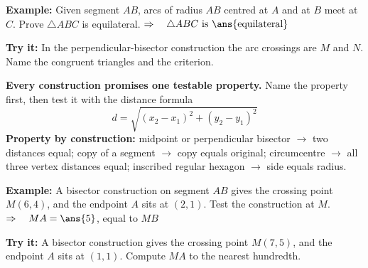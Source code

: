 \documentclass[12pt]{article}
\begin{document}
\begin{examplebox}
\textbf{Example:} \quad Given segment $AB$, arcs of radius $AB$ centred at $A$ and at $B$
meet at $C$. Prove $\triangle ABC$ is equilateral.
$\Rightarrow\quad \triangle ABC \text{ is } \ans{\text{equilateral}}$
\end{examplebox}

\begin{tryitbox}
\textbf{Try it:} \quad In the perpendicular-bisector construction the arc crossings are
$M$ and $N$. Name the congruent triangles and the criterion.\\[2pt]
\end{tryitbox}


\begin{formulabox}
\textbf{Every construction promises one testable property.} Name the property first, then
test it with the distance formula
\[ d = \sqrt{(x_2 - x_1)^2 + (y_2 - y_1)^2} \]
\textbf{Property by construction:} midpoint or perpendicular bisector $\to$ two distances
equal; copy of a segment $\to$ copy equals original; circumcentre $\to$ all three vertex
distances equal; inscribed regular hexagon $\to$ side equals radius.
\end{formulabox}

\begin{examplebox}
\textbf{Example:} \quad A bisector construction on segment $AB$ gives the crossing point
$M(6, 4)$, and the endpoint $A$ sits at $(2, 1)$. Test the construction at $M$.
$\Rightarrow\quad MA = \ans{5}$, equal to $MB$
\end{examplebox}

\begin{tryitbox}
\textbf{Try it:} \quad A bisector construction gives the crossing point $M(7, 5)$, and
the endpoint $A$ sits at $(1, 1)$. Compute $MA$ to the nearest hundredth.\\[2pt]
\end{tryitbox}
\end{document}
